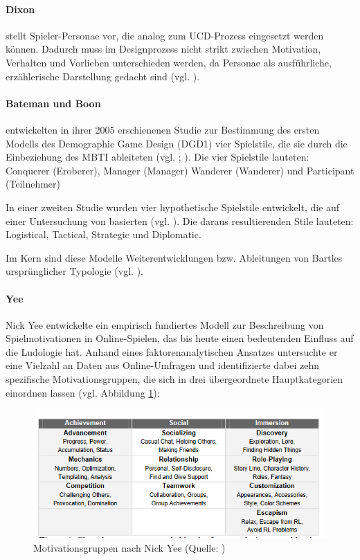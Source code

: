 \paragraph{Dixon} 
stellt Spieler-Personae vor, die analog zum \ac{UCD}-Prozess eingesetzt werden können. Dadurch muss im Designprozess nicht strikt zwischen Motivation, Verhalten und Vorlieben unterschieden werden, da Personae als ausführliche, erzählerische Darstellung gedacht sind (vgl. \cite{dixon_player_nodate}).

\paragraph{Bateman und Boon}
entwickelten in ihrer 2005 erschienenen Studie zur Bestimmung des ersten Modells des Demographic Game Design (DGD1) vier Spielstile, die sie durch die Einbeziehung des \ac{MBTI} ableiteten (vgl. \cite{noauthor_mbti_nodate}; \cite{bateman_21st_2005}).
Die vier Spielstile lauteten: Conquerer (Eroberer), Manager (Manager) Wanderer (Wanderer) und Participant (Teilnehmer)

In einer zweiten Studie wurden vier hypothetische Spielstile entwickelt, die auf einer Untersuchung von \cite{berens_understanding_2000} basierten (vgl. \cite{bateman_player_2012}). Die daraus resultierenden Stile lauteten: Logistical, Tactical, Strategic und Diplomatic.

Im Kern sind diese Modelle Weiterentwicklungen bzw. Ableitungen von Bartles ursprünglicher Typologie (vgl. \cite{ludologie_spielertypen_nodate}).

\paragraph{Yee}
Nick Yee entwickelte ein empirisch fundiertes Modell zur Beschreibung von Spielmotivationen in Online-Spielen, das bis heute einen bedeutenden Einfluss auf die Ludologie hat. Anhand eines faktorenanalytischen Ansatzes untersuchte er eine Vielzahl an Daten aus Online-Umfragen und identifizierte dabei zehn spezifische Motivationsgruppen, die sich in drei übergeordnete Hauptkategorien einordnen lassen (vgl. Abbildung \ref{fig:nick_yee_motivations}):

\begin{figure}[ht]
\centering
\includegraphics[width=1\linewidth]{content/pictures/nick_yee_categorizations.PNG}
\caption{Motivationsgruppen nach Nick Yee (Quelle: \cite{yee_motivations_nodate})}
\label{fig:nick_yee_motivations}
\end{figure}

